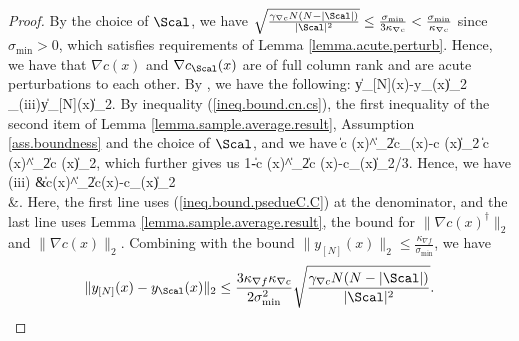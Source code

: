 \begin{proof}

	
By the choice of $\Scal$, we have $\sqrt{ \frac{\gamma_{\nabla c}N(N-|\Scal|)}{|\Scal|^2}}\le \frac{\sigma_{\min}}{3\kappa_{\nabla c}}<\frac{\sigma_{\min}}{\kappa_{\nabla c}}$ since $\sigma_{\min}>0$, which satisfies requirements of Lemma \ref{lemma.acute.perturb}. Hence, we have that $\nabla c (x)$ and $\nabla c_\Scal(x)$ are of full column rank and are acute perturbations to each other. By \cite[Theorem 5.2]{396bf6e1-ef54-3bf6-a49b-862db8404076}, we have the following:
\bequation
\label{ineq.define.iii}
	\|y_{[N]}(x)-y_\Scal(x)\|_2
	\le {}_{(iii)}\|y_{[N]}(x)\|_2.
\eequation
	By inequality (\ref{ineq.bound.cn.cs}), the first inequality of the second item of Lemma \ref{lemma.sample.average.result}, Assumption \ref{ass.boundness} and the choice of $\Scal$, and we have
	\bequationNN
	\|\nabla c (x)^\dag\|_2\|\nabla c_\Scal(x)-\nabla c (x)\|_2
	\le{}\|\nabla c (x)^\dag\|_2\|\nabla c (x)\|_2\le {},
	\eequationNN
which further gives us
	\bequation
	\label{ineq.bound.psedueC.C}
		1-\|\nabla c (x)^\dag\|_2\|\nabla c (x)-\nabla c_\Scal(x)\|_2/3.
	\eequation
	Hence, we have
	\bequation
	\label{ineq.bound.psi}
	\baligned
	(iii)
	&\le {}\|\nabla c(x)^\dag\|_2\|\nabla c(x)-\nabla c_\Scal(x)\|_2\\
	&\le {}.
\ealigned
\eequation
Here, the first line uses (\ref{ineq.bound.psedueC.C}) at the denominator, and the last line uses Lemma \ref{lemma.sample.average.result}, the bound for $\|\nabla c(x)^\dag\|_2$ and $\|\nabla c(x)\|_2$. Combining with the bound $\|y_{[N]}(x)\|_2\le\frac{\kappa_{\nabla f}}{\sigma_{\min}}$, we have
	\[
	\|y_{[N]}(x)-y_\Scal(x)\|_2
	 \le \frac{3\kappa_{\nabla f}\kappa_{\nabla c}}{2 \sigma_{\min}^2}\sqrt{ \frac{\gamma_{\nabla c} N(N-|\Scal|)}{|\Scal|^2}}.
	\]
	

\end{proof}
